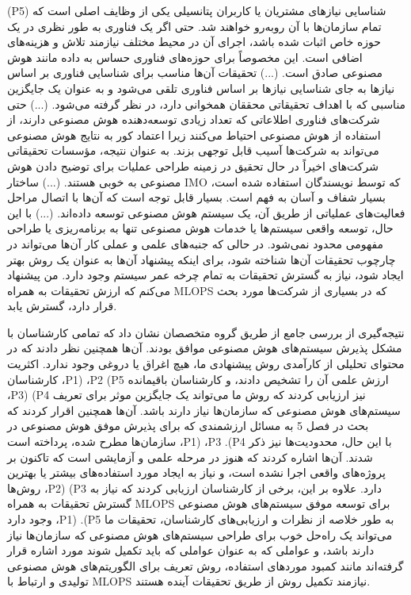 \documentclass[a4paper,10pt]{article}
\begin{document}
                    \begin{addinfo}
                        
                        (P5) شناسایی نیازهای مشتریان یا کاربران پتانسیلی یکی از وظایف اصلی است که تمام سازمان‌ها با آن روبه‌رو خواهند شد. حتی اگر یک فناوری به طور نظری در یک حوزه خاص اثبات شده باشد، اجرای آن در محیط مختلف نیازمند تلاش و هزینه‌های اضافی است. این مخصوصاً برای حوزه‌های فناوری حساس به داده مانند هوش مصنوعی صادق است. (...) تحقیقات آن‌ها مناسب برای شناسایی فناوری بر اساس نیازها به جای شناسایی نیازها بر اساس فناوری تلقی می‌شود و به عنوان یک جایگزین مناسبی که با اهداف تحقیقاتی محققان همخوانی دارد، در نظر گرفته می‌شود. (...) حتی شرکت‌های فناوری اطلاعاتی که تعداد زیادی توسعه‌دهنده هوش مصنوعی دارند، از استفاده از هوش مصنوعی احتیاط می‌کنند زیرا اعتماد کور به نتایج هوش مصنوعی می‌تواند به شرکت‌ها آسیب قابل توجهی بزند. به عنوان نتیجه، مؤسسات تحقیقاتی شرکت‌های اخیراً در حال تحقیق در زمینه طراحی عملیات برای توضیح دادن هوش مصنوعی به خوبی هستند. (...) ساختار IMO که توسط نویسندگان استفاده شده است، بسیار شفاف و آسان به فهم است. بسیار قابل توجه است که آن‌ها با اتصال مراحل فعالیت‌های عملیاتی از طریق آن، یک سیستم هوش مصنوعی توسعه داده‌اند. (...) با این حال، توسعه واقعی سیستم‌ها یا خدمات هوش مصنوعی تنها به برنامه‌ریزی یا طراحی مفهومی محدود نمی‌شود. در حالی که جنبه‌های علمی و عملی کار آن‌ها می‌تواند در چارچوب تحقیقات آن‌ها شناخته شود، برای اینکه پیشنهاد آن‌ها به عنوان یک روش بهتر ایجاد شود، نیاز به گسترش تحقیقات به تمام چرخه عمر سیستم وجود دارد. من پیشنهاد می‌کنم که ارزش تحقیقات به همراه MLOPS که در بسیاری از شرکت‌ها مورد بحث قرار دارد، گسترش یابد.

                    \end{addinfo}

                    نتیجه‌گیری از بررسی جامع از طریق گروه متخصصان نشان داد که تمامی کارشناسان با مشکل پذیرش سیستم‌های هوش مصنوعی موافق بودند. آن‌ها همچنین نظر دادند که در محتوای تحلیلی از کارآمدی روش پیشنهادی ما، هیچ اغراق یا دروغی وجود ندارد. اکثریت کارشناسان ،P1) ،P2 (P5 ارزش علمی آن را تشخیص دادند، و کارشناسان باقیمانده ،P3) (P4 نیز ارزیابی کردند که روش ما می‌تواند یک جایگزین موثر برای تعریف سیستم‌های هوش مصنوعی که سازمان‌ها نیاز دارند باشد. آن‌ها همچنین اقرار کردند که بحث در فصل 5 به مسائل ارزشمندی که برای پذیرش موفق هوش مصنوعی در سازمان‌ها مطرح شده، پرداخته است ،P1) ،P3 .(P4 با این حال، محدودیت‌ها نیز ذکر شدند. آن‌ها اشاره کردند که هنوز در مرحله علمی و آزمایشی است که تاکنون بر پروژه‌های واقعی اجرا نشده است، و نیاز به ایجاد مورد استفاده‌های بیشتر یا بهترین روش‌ها ،P2) (P3 دارد. علاوه بر این، برخی از کارشناسان ارزیابی کردند که نیاز به گسترش تحقیقات به همراه MLOPS برای توسعه موفق سیستم‌های هوش مصنوعی وجود دارد ،P1) .(P5 به طور خلاصه از نظرات و ارزیابی‌های کارشناسان، تحقیقات ما می‌تواند یک راه‌حل خوب برای طراحی سیستم‌های هوش مصنوعی که سازمان‌ها نیاز دارند باشد، و عواملی که به عنوان عواملی که باید تکمیل شوند مورد اشاره قرار گرفته‌اند مانند کمبود موردهای استفاده، روش تعریف برای الگوریتم‌های هوش مصنوعی تولیدی و ارتباط با MLOPS نیازمند تکمیل روش از طریق تحقیقات آینده هستند.
\end{document}
